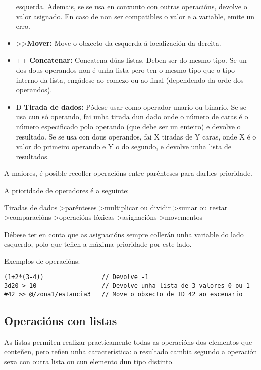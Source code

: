 \begin{itemize}
  esquerda. Ademais, se se usa en conxunto con outras operacións, devolve o
  valor asignado. En caso de non ser compatibles o valor e a variable, emite un
  erro.
  \item \textgreater\textgreater {\bf Mover:} Move o obxecto da esquerda á
  localización da dereita.
  \item ++ {\bf Concatenar:} Concatena dúas listas. Deben ser do mesmo tipo. Se
  un dos dous operandos non é unha lista pero ten o mesmo tipo que o tipo
  interno da lista, engádese ao comezo ou ao final (dependendo da orde dos
  operandos).
  \item D {\bf Tirada de dados:} Pódese usar como operador unario ou binario. Se
  se usa cun só operando, fai unha tirada dun dado onde o número de caras é o
  número especificado polo operando (que debe ser un enteiro) e devolve o
  resultado. Se se usa con dous operandos, fai X tiradas de Y caras, onde X é o
  valor do primeiro operando e Y o do segundo, e devolve unha lista de
  resultados.
\end{itemize}
\par A maiores, é posible recoller operacións entre parénteses para darlles
prioridade.
\par A prioridade de operadores é a seguinte:
\par
Tiradas de dados \textgreater parénteses \textgreater multiplicar ou dividir
\textgreater sumar ou restar \textgreater comparacións \textgreater operacións
lóxicas \textgreater asignacións \textgreater movementos
\par
Débese ter en conta que as asignacións sempre collerán unha variable do
lado esquerdo, polo que teñen a máxima prioridade por este lado.
\par Exemplos de operacións:
\begin{lstlisting}
(1+2*(3-4))                // Devolve -1
3d20 > 10                  // Devolve unha lista de 3 valores 0 ou 1
#42 >> @/zona1/estancia3   // Move o obxecto de ID 42 ao escenario
\end{lstlisting}
\subsection{Operacións con listas}
As listas permiten realizar practicamente todas as operacións dos elementos que
conteñen, pero teñen unha característica: o resultado cambia segundo a operación
sexa con outra lista ou cun elemento dun tipo distinto.
